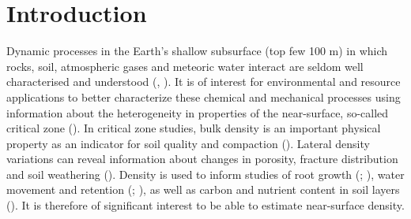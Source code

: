 \documentclass[]{article}
\begin{document}
	
	\newpage
	\section{Introduction}
	
		

	Dynamic processes in the Earth's shallow subsurface (top few 100 m) in which rocks, soil, atmospheric gases and meteoric water interact are seldom well characterised and understood (\cite{parsekian2015multiscale}, \cite{riebe2017controls}). It is of interest for environmental and resource applications to better characterize these chemical and mechanical processes using information about the heterogeneity in properties of the near-surface, so-called critical zone (\cite{anderson2007physical}). In critical zone studies, bulk density is an important physical property as an indicator for soil quality and compaction (\cite{suuster2011soil}). Lateral density variations can reveal information about changes in porosity, fracture distribution and soil weathering (\cite{flinchum2022p}). Density is used to inform studies of root growth (\cite{brimhall1992deformational}; \cite{dexter2004soil}), water movement and retention (\cite{huang2011soil}; \cite{flinchum2018estimating}), as well as carbon and nutrient content in soil layers (\cite{nanko2014pedotransfer}). It is therefore of significant interest to be able to estimate near-surface density.\\
	
\end{document}
